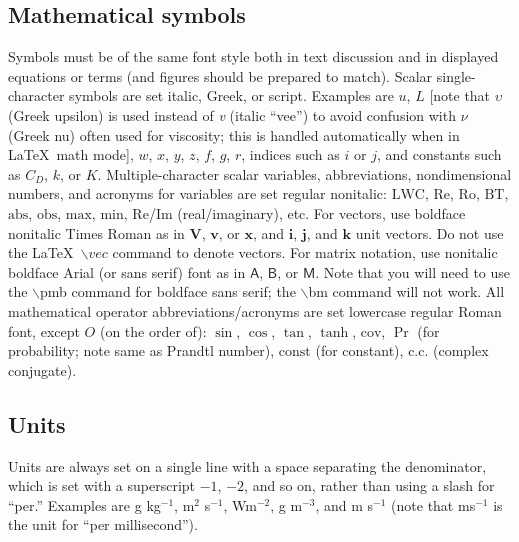 \documentclass[draft]{ametsoc}
\begin{document}
\hypertarget{mathematical-symbols}{%
\subsection{Mathematical symbols}\label{mathematical-symbols}}

Symbols must be of the same font style both in text discussion and in
displayed equations or terms (and figures should be prepared to match).
Scalar single-character symbols are set italic, Greek, or script.
Examples are \(u\), \(L\) {[}note that \(\upsilon\) (Greek upsilon) is
used instead of \emph{v} (italic ``vee'') to avoid confusion with
\(\nu\) (Greek nu) often used for viscosity; this is handled
automatically when in \LaTeX~math mode{]}, \(w\), \(x\), \(y\), \(z\),
\(f\), \(g\), \(r\), indices such as \(i\) or \(j\), and constants such
as \(C_D\), \(k\), or \(K\). Multiple-character scalar variables,
abbreviations, nondimensional numbers, and acronyms for variables are
set regular nonitalic: \(\mathrm{LWC}\), \(\mathrm{Re}\),
\(\mathrm{Ro}\), \(\mathrm{BT}\), \(\mathrm{abs}\), \(\mathrm{obs}\),
\(\mathrm{max}\), \(\mathrm{min}\), \(\mathrm{Re}\)/\(\mathrm{Im}\)
(real/imaginary), etc. For vectors, use boldface nonitalic Times Roman
as in \(\mathbf{V}\), \(\mathbf{v}\), or \(\mathbf{x}\), and
\(\mathbf{i}\), \(\mathbf{j}\), and \(\mathbf{k}\) unit vectors. Do not
use the \LaTeX~\(\backslash vec\) command to denote vectors. For matrix
notation, use nonitalic boldface Arial (or sans serif) font as in
\(\pmb{\mathsf{A}}\), \(\pmb{\mathsf{B}}\), or \(\pmb{\mathsf{M}}\).
Note that you will need to use the \(\backslash\)pmb command for
boldface sans serif; the \(\backslash\)bm command will not work. All
mathematical operator abbreviations/acronyms are set lowercase regular
Roman font, except \(O\) (on the order of): \(\sin\), \(\cos\),
\(\tan\), \(\tanh\), \(\mathrm{cov}\), \(\Pr\) (for probability; note
same as Prandtl number), \(\mathrm{const}\) (for constant),
\(\mathrm{c.c.}\) (complex conjugate).

\hypertarget{units}{%
\subsection{Units}\label{units}}

Units are always set on a single line with a space separating the
denominator, which is set with a superscript \(-1\), \(-2\), and so on,
rather than using a slash for ``per.'' Examples are g kg\(^{-1}\),
m\(^2\) s\(^{-1}\), Wm\(^{-2}\), g m\(^{-3}\), and m s\(^{-1}\) (note
that ms\(^{-1}\) is the unit for ``per millisecond'').
\end{document}
